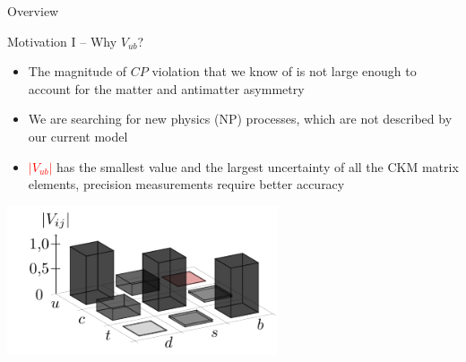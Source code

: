 \documentclass[serif]{beamer}
\begin{document}
\begin{frame}[t]{Overview}
\end{frame}


\begin{frame}[t]{Motivation I -- Why $V_{ub}$?}
\small
\vspace{-3mm}
\begin{block}{}
	\begin{itemize}
		\item The magnitude of $CP$ violation that we know of is not large enough to account for the matter and antimatter asymmetry
		\item We are searching for new physics (NP) processes, which are not described by our current model
		\item \textcolor{red}{$\vert V_{ub}\vert$} has the smallest value and the largest uncertainty of all the CKM matrix elements, precision measurements require better accuracy
	\end{itemize}
\end{block}

\begin{center}
	\includegraphics[width=0.6\textwidth]{texfig/fig_CKM}
\end{center}


\end{frame}


\end{document}
